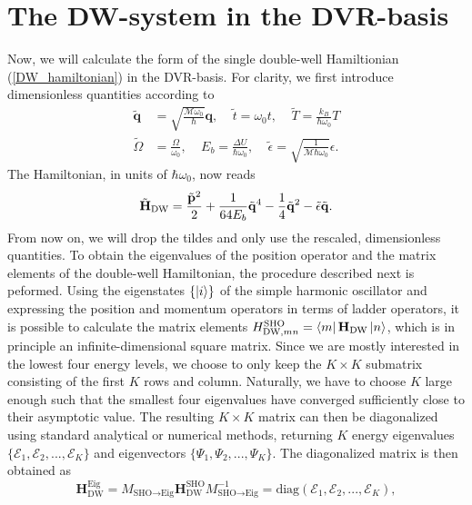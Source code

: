 \section{The DW-system in the DVR-basis}

Now, we will calculate the form of the single double-well Hamiltionian (\ref{DW_hamiltonian})
in the DVR-basis. For clarity, we first introduce dimensionless quantities according to 
%
\begin{align}
    \tilde{\mathbf{q}} &= \sqrt{\frac{\mathcal{M}\omega_0}{\hbar}}\mathbf{q}, \ \ \ \ \ \tilde{t} = \omega_0 t, \ \ \ \ \ \tilde{T} = \frac{k_B}{\hbar \omega_0} T \\
    \tilde{\Omega} &= \frac{\Omega}{\omega_0}, \ \ \ \ \ E_b = \frac{\Delta U}{\hbar\omega_0}, \ \ \ \ \ \tilde{\epsilon} = \sqrt{\frac{1}{\mathcal{M}\hbar\omega_0}}\epsilon .
\end{align}
%
The Hamiltonian, in units of $\hbar\omega_0$, now reads
%
\begin{equation}
    \tilde{\mathbf{H}}_{\text{DW}} = \frac{\tilde{\mathbf{p}}^2}{2} \\
    + \frac{1}{64 E_b}\tilde{\mathbf{q}}^4 - \frac{1}{4}\tilde{\mathbf{q}}^2 \\
    - \tilde{\epsilon}\tilde{\mathbf{q}}.
\end{equation}
%
From now on, we will drop the tildes and only use the rescaled, dimensionless
quantities. To obtain the eigenvalues of the position operator and the matrix elements
of the double-well Hamiltonian, the procedure described next is peformed. Using the 
eigenstates $\{ \ket{i} \}$ of the simple harmonic oscillator and expressing the position 
and momentum operators in terms of ladder operators, it is possible to calculate the matrix
elements $H_{\text{DW},mn}^{\text{SHO}}=\bra{m}\mathbf{H}_{\text{DW}}\ket{n}$,
which is in principle an infinite-dimensional square matrix. Since we are mostly interested in the 
lowest four energy levels, we choose to only keep the $K\times K$ submatrix consisting
of the first $K$ rows and column. Naturally, we have to choose $K$ large enough such
that the smallest four eigenvalues have converged sufficiently close to their asymptotic value.
The resulting $K\times K$ matrix can then be diagonalized using standard analytical or
numerical methods, returning $K$ energy eigenvalues $\{\mathcal{E}_1,\mathcal{E}_2,...,\mathcal{E}_K\}$
and eigenvectors $\{\Psi_1,\Psi_2,...,\Psi_K\}$. The diagonalized matrix is then obtained as 
%
\begin{equation}
    \mathbf{H}_{\text{DW}}^{\text{Eig}} = M_{\text{SHO}\rightarrow\text{Eig}} 
    \mathbf{H}_{\text{DW}}^{\text{SHO}} M_{\text{SHO}\rightarrow\text{Eig}}^{-1}
    = \text{diag}(\mathcal{E}_1,\mathcal{E}_2,...,\mathcal{E}_K),
\end{equation}
